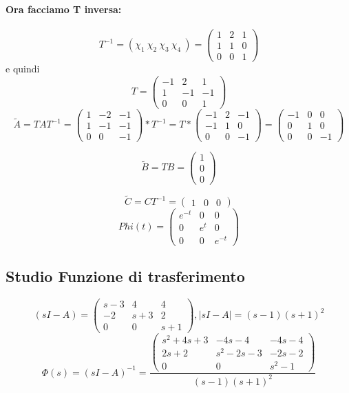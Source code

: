 \documentclass{article}
\begin{document}
\paragraph{Ora facciamo T inversa:} \[ T^{-1} = (\chi_1\ \chi_2\ \chi_3\ \chi_4\ ) = \left(\begin{matrix}1 & 2 & 1\\1 & 1 & 0\\0 & 0 & 1\end{matrix}\right) \]
e quindi \[T = \left(\begin{matrix}-1 & 2 & 1\\1 & -1 & -1\\0 & 0 & 1\end{matrix}\right)\]
\[ \widetilde{A} = TAT^{-1} = \left(\begin{matrix}1 & -2 & -1\\1 & -1 & -1\\0 & 0 & -1\end{matrix}\right) * T^{-1} = T*\left(\begin{matrix}-1 & 2 & -1\\-1 & 1 & 0\\0 & 0 & -1\end{matrix}\right) =\left(\begin{matrix}-1 & 0 & 0\\0 & 1 & 0\\0 & 0 & -1\end{matrix}\right) \]

\[ \widetilde{B} = T B = \left(\begin{matrix}1\\0\\0\end{matrix}\right) \]

\[ \widetilde{C} = C T^{-1} = \left(\begin{matrix}1 & 0 & 0\end{matrix}\right) \]
\[Phi(t) = \left(\begin{matrix}e^{- t} & 0 & 0\\0 & e^{t} & 0\\0 & 0 & e^{- t}\end{matrix}\right) \]

\subsection{Studio Funzione di trasferimento}

\[ (sI-A) = \left(\begin{matrix}s - 3 & 4 & 4\\-2 & s + 3 & 2\\0 & 0 & s + 1\end{matrix}\right), |sI-A| = \left(s - 1\right) \left(s + 1\right)^{2} \]
\[ \Phi(s) = (sI-A)^{-1} = \frac{\left(\begin{matrix}s^{2} + 4 s + 3 & - 4 s - 4 & - 4 s - 4\\2 s + 2 & s^{2} - 2 s - 3 & - 2 s - 2\\0 & 0 & s^{2} - 1\end{matrix}\right)}{\left(s - 1\right) \left(s + 1\right)^{2}} \]
\end{document}
